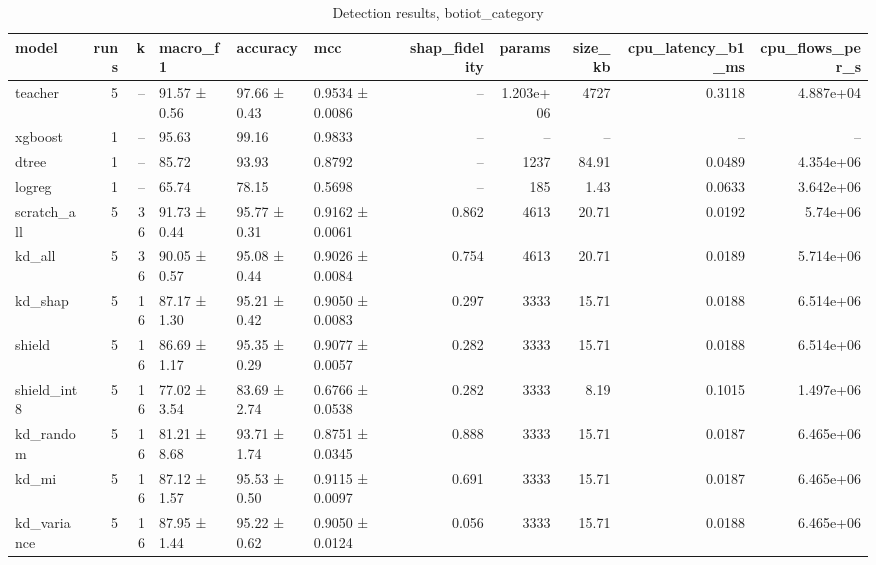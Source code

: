 \begin{table}
\caption{Detection results, botiot_category}
\begin{tabular}{lrrlllrrrrr}
\toprule
model & runs & k & macro_f1 & accuracy & mcc & shap_fidelity & params & size_kb & cpu_latency_b1_ms & cpu_flows_per_s \\
\midrule
teacher & 5 & -- & 91.57 ± 0.56 & 97.66 ± 0.43 & 0.9534 ± 0.0086 & -- & 1.203e+06 & 4727 & 0.3118 & 4.887e+04 \\
xgboost & 1 & -- & 95.63 & 99.16 & 0.9833 & -- & -- & -- & -- & -- \\
dtree & 1 & -- & 85.72 & 93.93 & 0.8792 & -- & 1237 & 84.91 & 0.0489 & 4.354e+06 \\
logreg & 1 & -- & 65.74 & 78.15 & 0.5698 & -- & 185 & 1.43 & 0.0633 & 3.642e+06 \\
scratch_all & 5 & 36 & 91.73 ± 0.44 & 95.77 ± 0.31 & 0.9162 ± 0.0061 & 0.862 & 4613 & 20.71 & 0.0192 & 5.74e+06 \\
kd_all & 5 & 36 & 90.05 ± 0.57 & 95.08 ± 0.44 & 0.9026 ± 0.0084 & 0.754 & 4613 & 20.71 & 0.0189 & 5.714e+06 \\
kd_shap & 5 & 16 & 87.17 ± 1.30 & 95.21 ± 0.42 & 0.9050 ± 0.0083 & 0.297 & 3333 & 15.71 & 0.0188 & 6.514e+06 \\
shield & 5 & 16 & 86.69 ± 1.17 & 95.35 ± 0.29 & 0.9077 ± 0.0057 & 0.282 & 3333 & 15.71 & 0.0188 & 6.514e+06 \\
shield_int8 & 5 & 16 & 77.02 ± 3.54 & 83.69 ± 2.74 & 0.6766 ± 0.0538 & 0.282 & 3333 & 8.19 & 0.1015 & 1.497e+06 \\
kd_random & 5 & 16 & 81.21 ± 8.68 & 93.71 ± 1.74 & 0.8751 ± 0.0345 & 0.888 & 3333 & 15.71 & 0.0187 & 6.465e+06 \\
kd_mi & 5 & 16 & 87.12 ± 1.57 & 95.53 ± 0.50 & 0.9115 ± 0.0097 & 0.691 & 3333 & 15.71 & 0.0187 & 6.465e+06 \\
kd_variance & 5 & 16 & 87.95 ± 1.44 & 95.22 ± 0.62 & 0.9050 ± 0.0124 & 0.056 & 3333 & 15.71 & 0.0188 & 6.465e+06 \\
\bottomrule
\end{tabular}
\end{table}
